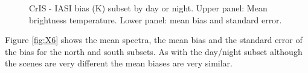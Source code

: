 \documentclass[twocolumn,10pt]{article}
\begin{document}


\begin{figure}[htb]
    \centering
    \caption{CrIS - IASI bias (K) subset by day or night. Upper panel: Mean brightness temperature. Lower panel: mean bias and standard error.}%
    \label{fig:X5}%
\end{figure}

Figure \ref{fig:X6} shows the mean spectra, the mean bias and the standard error of the bias for the north and south subsets.
As with the day/night subset although the scenes are very different the mean biases are
very similar.
\end{document}
